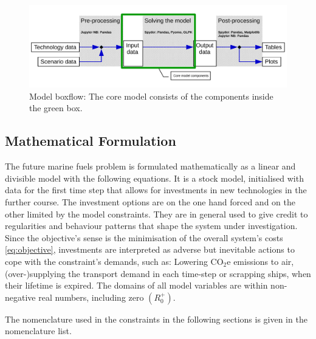 \documentclass[article]{elsarticle}
\begin{document}
\begin{figure}[htb]
    \centering
    \includegraphics[width=\textwidth]{figures/model_boxflow_paper.pdf}
    \caption{Model boxflow: The core model consists of the components inside the green box.}
    \label{fig:model_boxflow}
\end{figure}


\subsection{Mathematical Formulation}
\label{subsec:Mat}
The future marine fuels problem is formulated mathematically as a linear and divisible model with the following equations. It is a stock model, initialised with data for the first time step that allows for investments in new technologies in the further course. The investment options are on the one hand forced and on the other limited by the model constraints. They are in general used to give credit to regularities and behaviour patterns that shape the system under investigation. Since the objective's sense is the minimisation of the overall system's costs \cref{eq:objective}, investments are interpreted as adverse but inevitable actions to cope with the constraint's demands, such as: Lowering CO$_2$e emissions to air, (over-)supplying the transport demand in each time-step or scrapping ships, when their lifetime is expired. The domains of all model variables are within non-negative real numbers, including zero $\left(R_{0}^{+}\right)$.

The nomenclature used in the constraints in the following sections is given in the nomenclature list.
\glsdisablehyper
\glsaddall
\begin{table}[htb] 
\renewcommand\tablename{Nomenclature list}
\begin{mdframed}
\footnotesize{
\begin{multicols}{2}
\printglossary[style=tree,type=a]
\vspace{-0.3cm}
\printglossary[style=tree,type=s]
\vspace{-0.3cm}
\printglossary[style=tree,type=v]
\vspace{-0.3cm}
\printglossary[style=tree,type=p]
\end{multicols}
}
\end{mdframed}
\caption{}
\end{table}
\end{document}
